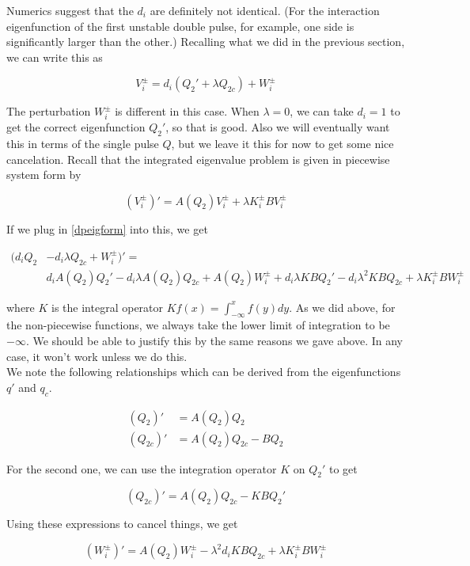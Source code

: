\documentclass[12pt]{article}
\begin{document}
Numerics suggest that the $d_i$ are definitely not identical. (For the interaction eigenfunction of the first unstable double pulse, for example, one side is significantly larger than the other.) Recalling what we did in the previous section, we can write this as

\begin{equation}\label{dpeigform}
V_i^\pm = d_i( Q_2' + \lambda Q_{2c} ) + W_i^\pm
\end{equation}

The perturbation $W_i^\pm$ is different in this case. When $\lambda = 0$, we can take $d_i = 1$ to get the correct eigenfunction $Q_2'$, so that is good. Also we will eventually want this in terms of the single pulse $Q$, but we leave it this for now to get some nice cancelation. Recall that the integrated eigenvalue problem is given in piecewise system form by

\[
(V_i^\pm)' = A(Q_2)V_i^\pm + \lambda K_i^\pm B V_i^\pm
\]

If we plug in \eqref{dpeigform} into this, we get 

\begin{align*}
(d_i Q_2 &- d_i \lambda Q_{2c} + W_i^\pm)' = \\
&d_i A(Q_2)Q_2' - d_i \lambda A(Q_2)Q_{2c} + A(Q_2) W_i^\pm + d_i \lambda KBQ_2' - d_i \lambda^2 KBQ_{2c} + \lambda K_i^\pm B W_i^\pm 
\end{align*}

where $K$ is the integral operator $Kf(x) = \int_{-\infty}^x f(y) dy$. As we did above, for the non-piecewise functions, we always take the lower limit of integration to be $-\infty$. We should be able to justify this by the same reasons we gave above. In any case, it won't work unless we do this.\\

We note the following relationships which can be derived from the eigenfunctions $q'$ and $q_c$.

\begin{align*}
(Q_2)' &= A(Q_2)Q_2 \\
(Q_{2c})' &= A(Q_{2})Q_{2c} - BQ_2  
\end{align*} 

For the second one, we can use the integration operator $K$ on $Q_2'$ to get

\[
(Q_{2c})' = A(Q_{2})Q_{2c} - KBQ_2'
\]

Using these expressions to cancel things, we get

\[
(W_i^\pm)' = A(Q_2)W_i^\pm - \lambda^2 d_i KBQ_{2c} + \lambda K_i^\pm BW_i^\pm
\]
\end{document}
